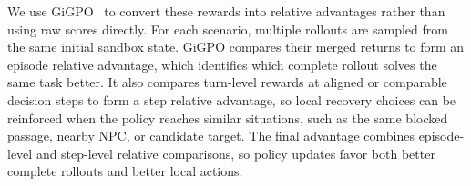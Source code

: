 We use GiGPO~\cite{feng2025gigpo} to convert these rewards into relative
advantages rather than using raw scores directly. For each scenario,
multiple rollouts are sampled from the same initial sandbox state. GiGPO
compares their merged returns to form an episode relative advantage,
which identifies which complete rollout solves the same task better. It
also compares turn-level rewards at aligned or comparable decision steps
to form a step relative advantage, so local recovery choices can be
reinforced when the policy reaches similar situations, such as the same
blocked passage, nearby NPC, or candidate target. The final advantage
combines episode-level and step-level relative comparisons, so policy
updates favor both better complete rollouts and better local actions.




